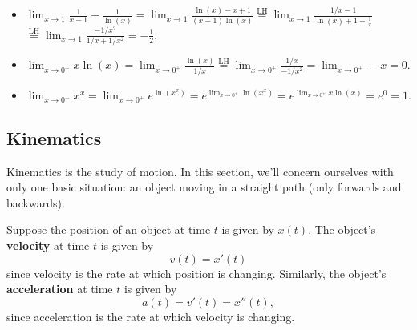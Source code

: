 \begin{itemize}

\item
$\displaystyle \lim_{x\to1} \frac{1}{x-1} - \frac{1}{\ln(x)}
= \lim_{x\to1} \frac{\ln\left(x\right)-x+1}{(x-1)\ln\left(x\right)}
\overset{\text{LH}}{=} \lim_{x\to1}\frac{{1}/{x}-1}{\ln\left(x\right)+1-\frac{1}{x}}$\\
\phantom{} \hspace{1.01in}$\overset{\text{LH}}{=}\lim_{x\to1} \frac{-{1}/{x^{2}}}{{1}/{x}+{1}/{x^{2}}}
=-\frac12$.

\item
$\displaystyle \lim_{x\to 0^+} x\ln(x) =\lim_{x\to 0^+} \frac{\ln(x)}{1/x} \overset{\text{LH}}{=}\lim_{x\to0^+}\frac{1/x}{-1/x^2}=\lim_{x\to0^+}-x=0$.

\item $\displaystyle\lim_{x\to 0^+} x^x =\lim_{x\to0^+}e^{\ln(x^x)}=e^{\displaystyle\lim_{x\to0^+}\ln(x^x)}=e^{\displaystyle\lim_{x\to 0^+}x\ln(x)} = e^0 = 1.$






\end{itemize}





\subsection{Kinematics}

Kinematics is the study of motion. In this section, we'll concern ourselves with only one basic situation: an object moving in a straight path (only forwards and backwards).

Suppose the position of an object at time $t$ is given by $x(t)$. The object's \textbf{velocity} at time $t$ is given by $$v(t)=x'(t)$$ since velocity is the rate at which position is changing. Similarly, the object's \textbf{acceleration} at time $t$ is given by $$a(t)=v'(t)=x''(t),$$ since acceleration is the rate at which velocity is changing.


